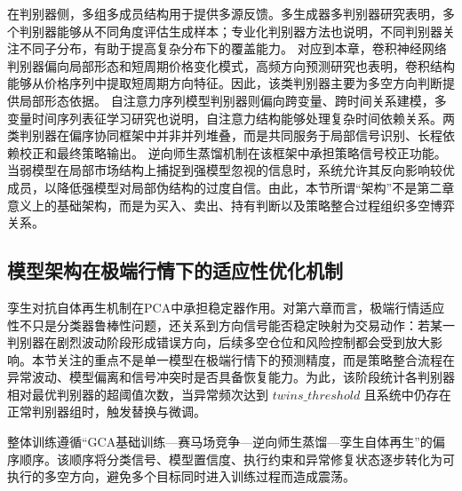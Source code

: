 在判别器侧，多组多成员结构用于提供多源反馈。多生成器多判别器研究表明，多个判别器能够从不同角度评估生成样本\cite{durugkar2017generative}；专业化判别器方法也说明，不同判别器关注不同子分布，有助于提高复杂分布下的覆盖能力\cite{choi2022mclgan}。
对应到本章，卷积神经网络判别器偏向局部形态和短周期价格变化模式，高频方向预测研究也表明，卷积结构能够从价格序列中提取短周期方向特征\cite{tsantekidis2017forecasting}。因此，该类判别器主要为多空方向判断提供局部形态依据。
自注意力序列模型判别器则偏向跨变量、跨时间关系建模，多变量时间序列表征学习研究也说明，自注意力结构能够处理复杂时间依赖关系\cite{zerveas2021transformer}。两类判别器在偏序协同框架中并非并列堆叠，而是共同服务于局部信号识别、长程依赖校正和最终策略输出。
逆向师生蒸馏机制在该框架中承担策略信号校正功能。当弱模型在局部市场结构上捕捉到强模型忽视的信息时，系统允许其反向影响较优成员，以降低强模型对局部伪结构的过度自信。由此，本节所谓“架构”不是第二章意义上的基础架构，而是为买入、卖出、持有判断以及策略整合过程组织多空博弈关系。

\subsection{模型架构在极端行情下的适应性优化机制}


孪生对抗自体再生机制在PCA中承担稳定器作用。对第六章而言，极端行情适应性不只是分类器鲁棒性问题，还关系到方向信号能否稳定映射为交易动作：若某一判别器在剧烈波动阶段形成错误方向，后续多空仓位和风险控制都会受到放大影响。本节关注的重点不是单一模型在极端行情下的预测精度，而是策略整合流程在异常波动、模型偏离和信号冲突时是否具备恢复能力。为此，该阶段统计各判别器相对最优判别器的超阈值次数，当异常频次达到 $twins\_threshold$ 且系统中仍存在正常判别器组时，触发替换与微调。

整体训练遵循“GCA基础训练—赛马场竞争—逆向师生蒸馏—孪生自体再生”的偏序顺序。该顺序将分类信号、模型置信度、执行约束和异常修复状态逐步转化为可执行的多空方向，避免多个目标同时进入训练过程而造成震荡。

